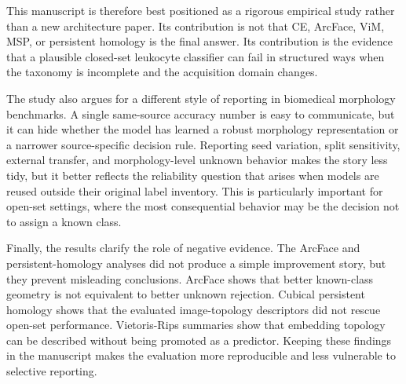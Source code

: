 This manuscript is therefore best positioned as a rigorous empirical study rather than a new architecture paper. Its contribution is not that CE, ArcFace, ViM, MSP, or persistent homology is the final answer. Its contribution is the evidence that a plausible closed-set leukocyte classifier can fail in structured ways when the taxonomy is incomplete and the acquisition domain changes.

The study also argues for a different style of reporting in biomedical morphology benchmarks. A single same-source accuracy number is easy to communicate, but it can hide whether the model has learned a robust morphology representation or a narrower source-specific decision rule. Reporting seed variation, split sensitivity, external transfer, and morphology-level unknown behavior makes the story less tidy, but it better reflects the reliability question that arises when models are reused outside their original label inventory. This is particularly important for open-set settings, where the most consequential behavior may be the decision not to assign a known class.

Finally, the results clarify the role of negative evidence. The ArcFace and persistent-homology analyses did not produce a simple improvement story, but they prevent misleading conclusions. ArcFace shows that better known-class geometry is not equivalent to better unknown rejection. Cubical persistent homology shows that the evaluated image-topology descriptors did not rescue open-set performance. Vietoris-Rips summaries show that embedding topology can be described without being promoted as a predictor. Keeping these findings in the manuscript makes the evaluation more reproducible and less vulnerable to selective reporting.
